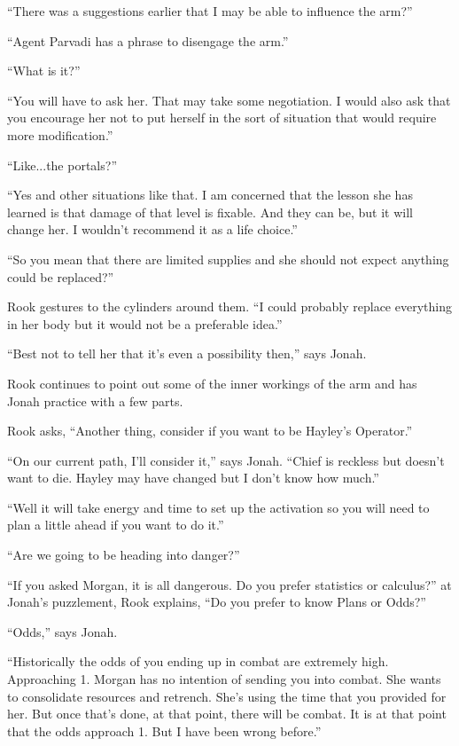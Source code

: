 ``There was a suggestions earlier that I may be able to influence the arm?''

``Agent Parvadi has a phrase to disengage the arm.''

``What is it?''

``You will have to ask her.  That may take some negotiation.  I would also ask that you encourage her not to put herself in the sort of situation that would require more modification.''

``Like...the portals?''

``Yes and other situations like that.  I am concerned that the lesson she has learned is that damage of that level is fixable.  And they can be, but it will change her.  I wouldn't recommend it as a life choice.''

``So you mean that there are limited supplies and she should not expect anything could be replaced?''

Rook gestures to the cylinders around them.  ``I could probably replace everything in her body but it would not be a preferable idea.''

``Best not to tell her that it's even a possibility then,'' says Jonah.

Rook continues to point out some of the inner workings of the arm and has Jonah practice with a few parts.

Rook asks, ``Another thing, consider if you want to be Hayley's Operator.''

``On our current path, I'll consider it,'' says Jonah.  ``Chief is reckless but doesn't want to die.  Hayley may have changed but I don't know how much.''

``Well it will take energy and time to set up the activation so you will need to plan a little ahead if you want to do it.''

``Are we going to be heading into danger?''

``If you asked Morgan, it is all dangerous.  Do you prefer statistics or calculus?''  at Jonah's puzzlement, Rook explains, ``Do you prefer to know Plans or Odds?''

``Odds,'' says Jonah.

``Historically the odds of you ending up in combat are extremely high. Approaching 1.  Morgan has no intention of sending you into combat.  She wants to consolidate resources and retrench.  She's using the time that you provided for her.  But once that's done, at that point, there will be combat.  It is at that point that the odds approach 1.  But I have been wrong before.''

